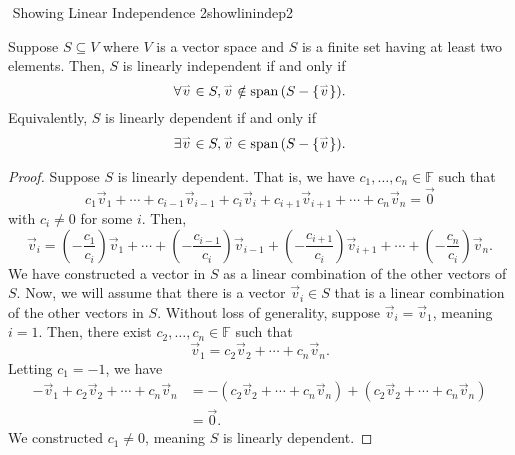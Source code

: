         \begin{theorem}{\Stop\,\,Showing Linear Independence 2}{showlinindep2}
            
            Suppose \(S\subseteq V\) where \(V\) is a vector space and \(S\) is a finite set having at least two elements. Then, \(S\) is linearly independent if and only if
            \begin{equation*}
                \forall\overset{_{\rightharpoonup}}{v}\in S,\overset{_{\rightharpoonup}}{v}\notin\text{span\,}(S-\{\overset{_{\rightharpoonup}}{v}\}).
            \end{equation*}
            Equivalently, \(S\) is linearly dependent if and only if
            \begin{equation*}
                \exists\overset{_{\rightharpoonup}}{v}\in S,\overset{_{\rightharpoonup}}{v}\in\text{span\,}(S-\{\overset{_{\rightharpoonup}}{v}\}).
            \end{equation*}
            \begin{proof}
                Suppose \(S\) is linearly dependent. That is, we have \(c_1,\ldots,c_n\in\mathbb{F}\) such that
                \begin{equation*}
                    c_1\vec{v}_1+\cdots+c_{i-1}\vec{v}_{i-1}+c_i\vec{v}_i+c_{i+1}\vec{v}_{i+1}+\cdots+c_n\vec{v}_n=\vec{0}
                \end{equation*}
                with \(c_i\neq0\) for some \(i\). Then,
                \begin{equation*}
                    \vec{v}_i=\left(-\frac{c_1}{c_i}\right)\vec{v}_1+\cdots+\left(-\frac{c_{i-1}}{c_i}\right)\vec{v}_{i-1}+\left(-\frac{c_{i+1}}{c_i}\right)\vec{v}_{i+1}+\cdots+\left(-\frac{c_n}{c_i}\right)\vec{v}_n.
                \end{equation*}
                We have constructed a vector in \(S\) as a linear combination of the other vectors of \(S\). Now, we will assume that there is a vector \(\vec{v}_i\in S\) that is a linear combination of the other vectors in \(S\). Without loss of generality, suppose \(\vec{v}_i=\vec{v}_1\), meaning \(i=1\). Then, there exist \(c_2,\ldots,c_n\in\mathbb{F}\) such that
                \begin{equation*}
                    \vec{v}_1=c_2\vec{v}_2+\cdots+c_n\vec{v}_n.
                \end{equation*}
                Letting \(c_1=-1\), we have
                \begin{align*}
                    -\vec{v}_1+c_2\vec{v}_2+\cdots+c_n\vec{v}_n&=-(c_2\vec{v}_2+\cdots+c_n\vec{v}_n)+(c_2\vec{v}_2+\cdots+c_n\vec{v}_n) \\
                    &=\vec{0}.
                \end{align*}
                We constructed \(c_1\neq0\), meaning \(S\) is linearly dependent.
            \end{proof}
        \end{theorem}
